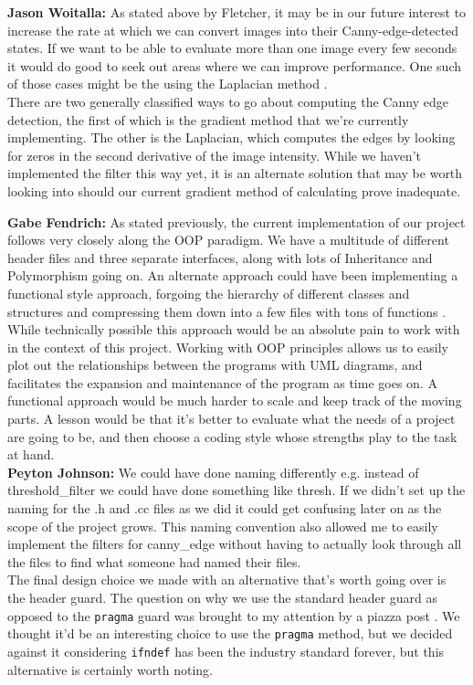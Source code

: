 \textbf{Jason Woitalla:}
As stated above by Fletcher, it may be in our future interest to increase the rate at which we can convert images into their Canny-edge-detected states. If we want to be able to evaluate more than one image every few seconds it would do good to seek out areas where we can improve performance. One such of those cases might be the using the Laplacian method \cite{laplace}. \\

There are two generally classified ways to go about computing the Canny edge detection, the first of which is the gradient method that we're currently implementing. The other is the Laplacian, which computes the edges by looking for zeros in the second derivative of the image intensity. While we haven't implemented the filter this way yet, it is an alternate solution that may be worth looking into should our current gradient method of calculating prove inadequate. \newpage


\textbf{Gabe Fendrich:}
As stated previously, the current implementation of our project follows very closely along the OOP paradigm. We have a multitude of different header files and three separate interfaces, along with lots of Inheritance and Polymorphism going on. An alternate approach could have been implementing a functional style approach, forgoing the hierarchy of different classes and structures and compressing them down into a few files with tons of functions \cite{cravey}. \\

While technically possible this approach would be an absolute pain to work with in the context of this project. Working with OOP principles allows us to easily plot out the relationships between the programs with UML diagrams, and facilitates the expansion and maintenance of the program as time goes on. A functional approach would be much harder to scale and keep track of the moving parts. A lesson would be that it's better to evaluate what the needs of a project are going to be, and then choose a coding style whose strengths play to the task at hand. \\

\textbf{Peyton Johnson:}
We could have done naming differently e.g. instead of threshold\_filter we could have done something like thresh. If we didn't set up the naming for the .h and .cc files as we did it could get confusing later on as the scope of the project grows. This naming convention also allowed me to easily implement the filters for canny\_edge without having to actually look through all the files to find what someone had named their files. \\

The final design choice we made with an alternative that's worth going over is the header guard. The question on why we use the standard header guard as opposed to the \texttt{pragma} guard was brought to my attention by a piazza post \cite{tom}.  We thought it’d be an interesting choice to use the \texttt{pragma} method, but we decided against it considering \texttt{ifndef} has been the industry standard forever, but this alternative is certainly worth noting.


